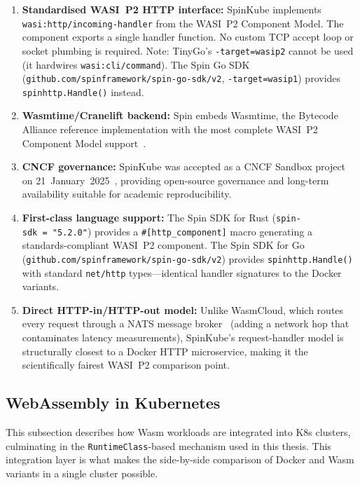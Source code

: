 \begin{enumerate}
    \item \begin{sloppypar}\textbf{Standardised \acs{WASI}~P2 \acs{HTTP} interface:} SpinKube implements \texttt{wasi:http/incoming-handler} from the \acs{WASI}~P2 Component Model. The component exports a single handler function. No custom \acs{TCP} accept loop or socket plumbing is required. Note: TinyGo's \texttt{-target=wasip2} cannot be used (it hardwires \texttt{wasi:cli/command}). The Spin Go \acs{SDK} (\texttt{github.com/spinframework/spin-go-sdk/v2}, \texttt{-target=wasip1}) provides \texttt{spinhttp.Handle()} instead.\end{sloppypar}
    \item \textbf{Wasmtime/Cranelift backend:} Spin embeds Wasmtime, the Bytecode Alliance reference implementation with the most complete \acs{WASI}~P2 Component Model support~\cite{bytecodealliance2024wasmtime, fermyon2024spin}.
    \item \textbf{\acs{CNCF} governance:} SpinKube was accepted as a \acs{CNCF} Sandbox project on 21~January~2025~\cite{cncf2025spinkube}, providing open-source governance and long-term availability suitable for academic reproducibility.
    \item \begin{sloppypar}\textbf{First-class language support:} The Spin \acs{SDK} for Rust (\texttt{spin-sdk~=~"5.2.0"}) provides a \texttt{\#[http\_component]} macro generating a standards-compliant \acs{WASI}~P2 component. The Spin \acs{SDK} for Go (\texttt{github.com/spinframework/spin-go-sdk/v2}) provides \texttt{spinhttp.Handle()} with standard \texttt{net/http} types---identical handler signatures to the Docker variants.\end{sloppypar}
    \item \textbf{Direct \acs{HTTP}-in/\acs{HTTP}-out model:} Unlike \acs{WasmCloud}, which routes every request through a \acs{NATS} message broker~\cite{wasmcloud2024} (adding a network hop that contaminates latency measurements), SpinKube's request-handler model is structurally closest to a Docker \acs{HTTP} microservice, making it the scientifically fairest \acs{WASI}~P2 comparison point.
\end{enumerate}

\subsection{WebAssembly in Kubernetes}
\label{sec:wasm_k8s}
\begin{sloppypar}
This subsection describes how \acs{Wasm} workloads are integrated into \acs{K8s} clusters, culminating in the \texttt{RuntimeClass}-based mechanism used in this thesis. This integration layer is what makes the side-by-side comparison of Docker and \acs{Wasm} variants in a single cluster possible.
\end{sloppypar}

